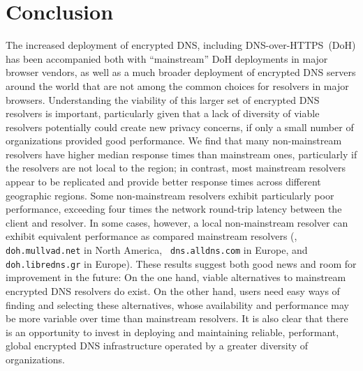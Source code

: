 \section{Conclusion}\label{sec:conclusion}

The increased deployment of encrypted DNS, including DNS-over-HTTPS~(DoH) has
been accompanied both with ``mainstream'' DoH deployments in major browser
vendors, as well as a much broader deployment of encrypted DNS servers around
the world that are not among the common choices for resolvers in major
browsers.  Understanding the viability of this larger set of encrypted DNS
resolvers is important, particularly given that a lack of diversity of viable
resolvers potentially could create new privacy concerns, if only a small
number of organizations provided good performance. We find that many
non-mainstream resolvers have higher median response times than mainstream
ones, particularly if the resolvers are not local to the region; in contrast,
most mainstream resolvers appear to be replicated and provide better response
times across different geographic regions. Some non-mainstream resolvers
exhibit particularly poor performance, exceeding four times the network
round-trip latency between the client and resolver. In some cases, however, a
local non-mainstream resolver can exhibit equivalent performance as compared
mainstream resolvers (\eg, {\tt doh.mullvad.net} in North America, {\tt
dns.alldns.com} in Europe, and {\tt doh.libredns.gr} in Europe). These results
suggest both good news and room for improvement in the future: On the one
hand, viable alternatives to mainstream encrypted DNS resolvers do exist.  On
the other hand, users need easy ways of finding and selecting these
alternatives, whose availability and performance may be more variable over
time than mainstream resolvers. It is also clear that there is an opportunity
to invest in deploying and maintaining reliable, performant, global encrypted
DNS infrastructure operated by a greater diversity of organizations.

